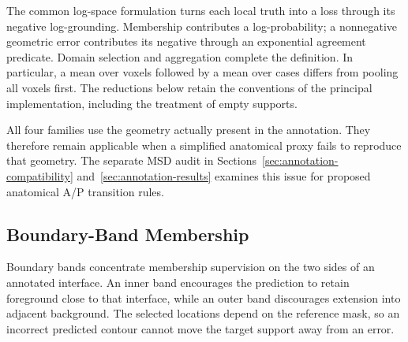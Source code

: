 \documentclass[12pt,a4paper]{article}
\begin{document}
The common log-space formulation turns each local truth into a loss
through its negative log-grounding. Membership contributes a
log-probability; a nonnegative geometric error contributes its negative
through an exponential agreement predicate. Domain selection and
aggregation complete the definition. In particular, a mean over voxels
followed by a mean over cases differs from pooling all voxels first.
The reductions below retain the conventions of the principal
implementation, including the treatment of empty supports.

All four families use the geometry actually present in the annotation.
They therefore remain applicable when a simplified anatomical proxy
fails to reproduce that geometry. The separate MSD audit in
Sections~\ref{sec:annotation-compatibility} and~\ref{sec:annotation-results}
examines this issue for proposed anatomical A/P transition rules.

\subsection{Boundary-Band Membership}\label{sec:boundary-band-constraints}

Boundary bands concentrate membership supervision on the two sides of an
annotated interface. An inner band encourages the prediction to retain
foreground close to that interface, while an outer band discourages
extension into adjacent background. The selected locations depend on the
reference mask, so an incorrect predicted contour cannot move the target
support away from an error.
\end{document}
